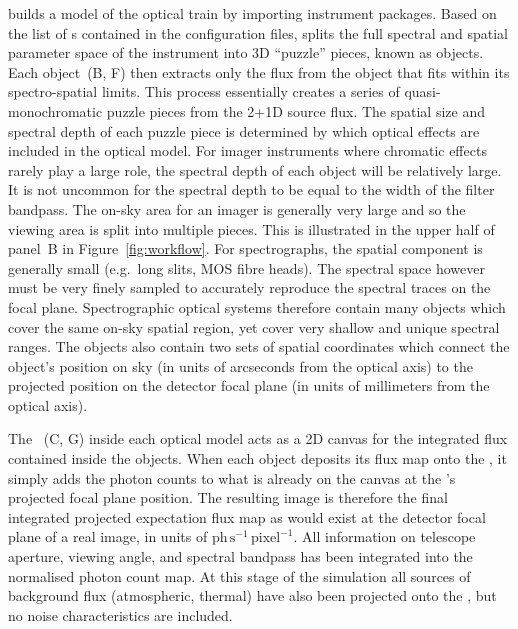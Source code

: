 \ScopeSim{} builds a model of the optical train by importing instrument packages.
Based on the list of \Effect{}s contained in the configuration files, \ScopeSim{} splits the full spectral and spatial parameter space of the instrument into 3D ``puzzle'' pieces, known as \FieldOfView{} objects.
Each \FieldOfView{} object~(B, F) then extracts only the flux from the \Source{} object that fits within its spectro-spatial limits.
This process essentially creates a series of quasi-monochromatic puzzle pieces from the 2+1D source flux.
The spatial size and spectral depth of each puzzle piece is determined by which optical effects are included in the optical model.
For imager instruments where chromatic effects rarely play a large role, the spectral depth of each \FieldOfView{} object will be relatively large.
It is not uncommon for the spectral depth to be equal to the width of the filter bandpass.
The on-sky area for an imager is generally very large and so the viewing area is split into multiple pieces.
This is illustrated in the upper half of panel~B in Figure~\ref{fig:workflow}.
For spectrographs, the spatial component is generally small (e.g.~long slits, MOS fibre heads).
The spectral space however must be very finely sampled to accurately reproduce the spectral traces on the focal plane.
Spectrographic optical systems therefore contain many \FieldOfView{} objects which cover the same on-sky spatial region, yet cover very shallow and unique spectral ranges.
The \FieldOfView{} objects also contain two sets of spatial coordinates which connect the object's position on sky (in units of arcseconds from the optical axis) to the projected position on the detector focal plane (in units of millimeters from the optical axis).

The \ImagePlane{}~(C, G) inside each optical model acts as a 2D canvas for the integrated flux contained inside the \FieldOfView{} objects.
When each \FieldOfView{} object deposits its flux map onto the \ImagePlane{}, it simply adds the photon counts to what is already on the canvas at the \FieldOfView{}'s projected focal plane position.
The resulting \ImagePlane{} image is therefore the final integrated projected expectation flux map as would exist at the detector focal plane of a real image, in units of $\mathrm{ph\,s^{-1}\,pixel^{-1}}$.
All information on telescope aperture, viewing angle, and spectral bandpass has been integrated into the normalised photon count map.
At this stage of the simulation all sources of background flux (atmospheric, thermal) have also been projected onto the \ImagePlane{}, but no noise characteristics are included.

